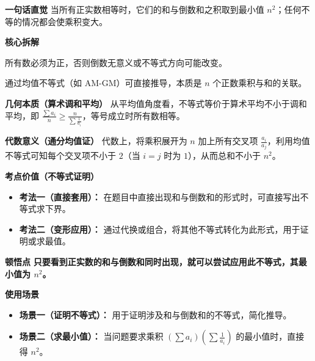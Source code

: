 \begin{explanationbox}
\textbf{\textcolor{CExplanation}{一句话直觉}}
当所有正实数相等时，它们的和与倒数和之积取到最小值 $n^2$；任何不等的情况都会使乘积变大。

\medskip
\textbf{\textcolor{CExplanation}{核心拆解}}
\begin{description}[style=nextline, leftmargin=2.8em, labelsep=0.5em, itemsep=0.45em]
    \item[\textbf{要点一（正实数前提）：}] 所有数必须为正，否则倒数无意义或不等式方向可能改变。
    \item[\textbf{要点二（均值不等式）：}] 通过均值不等式（如 AM-GM）可直接推导，本质是 $n$ 个正数乘积与和的关联。
\end{description}

\medskip
\textbf{\textcolor{CExplanation}{几何本质（算术调和平均）}}
从平均值角度看，不等式等价于算术平均不小于调和平均，即 $\frac{\sum a_i}{n} \geq \frac{n}{\sum \frac{1}{a_i}}$，等号成立时所有数相等。

\medskip
\textbf{\textcolor{CExplanation}{代数意义（通分均值证）}}
代数上，将乘积展开为 $n$ 加上所有交叉项 $\frac{a_i}{a_j}$，利用均值不等式可知每个交叉项不小于 $2$（当 $i=j$ 时为 $1$），从而总和不小于 $n^2$。

\medskip
\textbf{\textcolor{CExplanation}{考点价值（不等式证明）}}
\begin{itemize}[leftmargin=*, itemsep=0.5em, topsep=0.4em]
    \item \textbf{考法一（直接套用）：} 在题目中直接出现和与倒数和的形式时，可直接写出不等式求下界。
    \item \textbf{考法二（变形应用）：} 通过代换或组合，将其他不等式转化为此形式，用于证明或求最值。
\end{itemize}

\medskip
\textbf{\textcolor{CExplanation}{顿悟点}}
\textbf{只要看到正实数的和与倒数和同时出现，就可以尝试应用此不等式，其最小值为 $n^2$。}

\medskip
\textbf{\textcolor{CExplanation}{使用场景}}
\begin{itemize}[leftmargin=*, itemsep=0.5em, topsep=0.4em]
    \item \textbf{场景一（证明不等式）：} 用于证明涉及和与倒数和的不等式，简化推导。
    \item \textbf{场景二（求最小值）：} 当问题要求乘积 $(\sum a_i)(\sum \frac{1}{a_i})$ 的最小值时，直接得 $n^2$。
\end{itemize}
\end{explanationbox}
